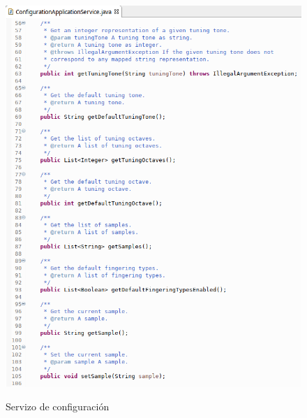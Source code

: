    \begin{figure}[htbp]
    \centering
    \includegraphics[scale=0.6, keepaspectratio=true]{./imagenes/servizo-configuracion-2.png} \\
    \caption{Servizo de configuración}
    \label{figura:ServizoConfiguracion2}
   \end{figure}
   
